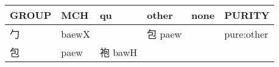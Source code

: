 \documentclass[14pt,a4paper]{scrartcl}
\begin{document}
\begin{longtable}[c]{@{}llllll@{}}
\toprule
\begin{minipage}[b]{0.14\columnwidth}\raggedright\strut
GROUP
\strut\end{minipage} &
\begin{minipage}[b]{0.14\columnwidth}\raggedright\strut
MCH
\strut\end{minipage} &
\begin{minipage}[b]{0.14\columnwidth}\raggedright\strut
qu
\strut\end{minipage} &
\begin{minipage}[b]{0.14\columnwidth}\raggedright\strut
other
\strut\end{minipage} &
\begin{minipage}[b]{0.14\columnwidth}\raggedright\strut
none
\strut\end{minipage} &
\begin{minipage}[b]{0.14\columnwidth}\raggedright\strut
PURITY
\strut\end{minipage}\tabularnewline
\midrule
\endhead
\begin{minipage}[t]{0.14\columnwidth}\raggedright\strut
勹
\strut\end{minipage} &
\begin{minipage}[t]{0.14\columnwidth}\raggedright\strut
baewX
\strut\end{minipage} &
\begin{minipage}[t]{0.14\columnwidth}\raggedright\strut
\strut\end{minipage} &
\begin{minipage}[t]{0.14\columnwidth}\raggedright\strut
包 paew
\strut\end{minipage} &
\begin{minipage}[t]{0.14\columnwidth}\raggedright\strut
\strut\end{minipage} &
\begin{minipage}[t]{0.14\columnwidth}\raggedright\strut
pure:other
\strut\end{minipage}\tabularnewline
\begin{minipage}[t]{0.14\columnwidth}\raggedright\strut
包
\strut\end{minipage} &
\begin{minipage}[t]{0.14\columnwidth}\raggedright\strut
paew
\strut\end{minipage} &
\begin{minipage}[t]{0.14\columnwidth}\raggedright\strut
袍 bawH
\strut\end{minipage} &
\begin{minipage}[t]{0.14\columnwidth}\raggedright\strut

\end{minipage}
\end{longtable}
\end{document}
